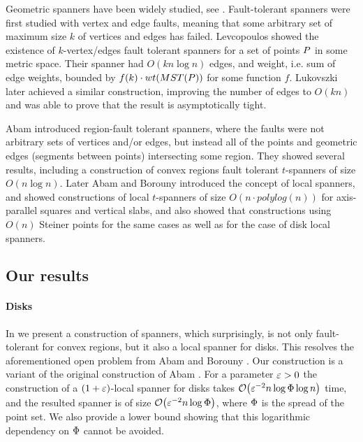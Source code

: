\documentclass[12pt]{article}%
\begin{document}
Geometric spanners have been widely studied, see
\cite{ns-gsn-07}. Fault-tolerant spanners were first studied with
vertex and edge faults, meaning that some arbitrary set of maximum
size $k$ of vertices and edges has failed. Levcopoulos \etal
\cite{lns-iacfts-02} showed the existence of $k$-vertex/edges fault
tolerant spanners for a set of points $P$ in some metric
space. Their spanner had $O(kn\log n)$ edges, and weight, i.e. sum of
edge weights, bounded by $f(k)\cdot wt(MST(P))$ for some function
$f$. Lukovszki \cite{l-nrftgs-99} later achieved a similar
construction, improving the number of edges to $O(kn)$ and was able to
prove that the result is asymptotically tight.

Abam \etal\cite{abfg-rftgs-09} introduced region-fault tolerant
spanners, where the faults were not arbitrary sets of vertices and/or
edges, but instead all of the points and geometric edges (segments
between points) intersecting some region. They showed several results,
including a construction of convex regions fault tolerant $t$-spanners
of size $O(n\log n)$. Later Abam and Borouny \cite{ab-lgs-21}
introduced the concept of local spanners, and showed constructions of
local $t$-spanners of size $O(n\cdot polylog(n))$ for axis-parallel
squares and vertical slabs, and also showed that constructions using
$O(n)$ Steiner points for the same cases as well as for the case of
disk local spanners.

\subsection*{Our results}

\paragraph{Disks}
In  we present a construction of spanners, which
surprisingly, is not only fault-tolerant for convex regions, but it
also a local spanner for disks. This resolves the aforementioned open
problem from Abam and Borouny \cite{ab-lgs-21}. Our construction is a
variant of the original construction of Abam \etal
\cite{abfg-rftgs-09}. For a parameter $\varepsilon>0$ the construction of a
$(1+\varepsilon)$-local spanner for disks takes
$\Of\pth{ \eps^{-2} n\log \spread \log n }$ time, and the resulted
spanner is of size $\Of\pth{ \eps^{-2} n\log \spread }$, where
$\Phi$ is the spread of the point set. We also provide a lower
bound showing that this logarithmic dependency on $\Phi$ cannot be
avoided.
 
\end{document}
